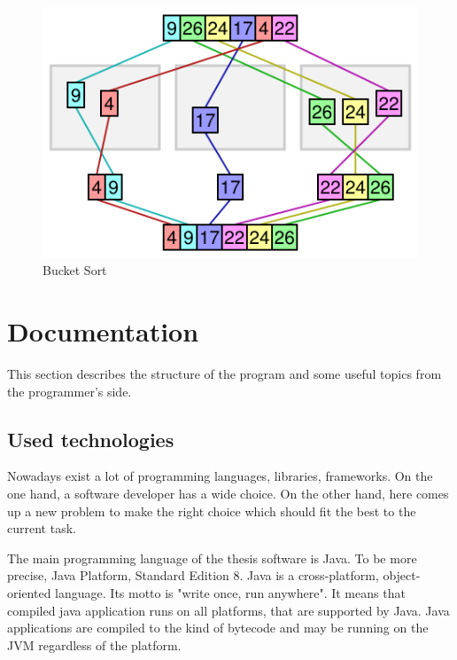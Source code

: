 \documentclass[
  field=inf,
  biblatex,
  language=english,
  glossaries,
  theorems=false,
  index
]{kidiplom}
\begin{document}
\begin{figure}[H]
\begin{center}
	
	\includegraphics[scale=0.5]{img/Bucketsort.png}
	\caption{Bucket Sort}\label{fig:bucketsort}
\end{center}
\end{figure}

\newpage
\section{Documentation}

This section describes the structure of the program and some useful topics from the programmer's side. 

\subsection{Used technologies}

Nowadays exist a lot of programming languages, libraries, frameworks. On the one hand, a software developer has a wide choice. On the other hand, here comes up a new problem to make the right choice which should fit the best to the current task.

The main programming language of the thesis software is Java. To be more precise, Java Platform, Standard Edition 8. Java is a cross-platform, object-oriented language. Its motto is "write once, run anywhere". It means that compiled java application runs on all platforms, that are supported by Java. Java applications are compiled to the kind of bytecode and may be running on the \Gls{JVM} regardless of the platform. 
\end{document}
